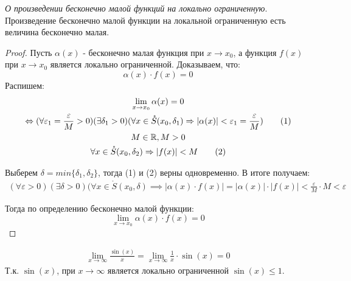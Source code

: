 \begin{theorem}
  \textit{О произведении бесконечно малой функций на локально ограниченную}. \\
  Произведение бесконечно малой функции на локальной ограниченную есть величина бесконечно малая.
\end{theorem}
\begin{proof}
  Пусть $\alpha(x)$ - бесконечно малая функция при $x \to x_0$, а функция $f(x)$ при $x \to  x_0$ является локально ограниченной. Доказываем, что: \[
  \alpha(x) \cdot f(x) = 0
  \] 
  Распишем:
  \begin{gather*}
    \lim_{x \to x_0} \alpha(x) = 0 \\
    \iff (\forall \varepsilon_1 = \frac{\varepsilon}{M} > 0)(\exists \delta_1 > 0)(\forall x \in \mathring{S}(x_0, \delta_1) \implies |\alpha(x)| < \varepsilon_1 = \frac{\varepsilon}{M}) \tag{1}\\
    M \in \R, M > 0 \\
    \forall x \in  \mathring{S}(x_0, \delta_2) \implies |f(x)| < M \tag{2} \\ 
  \end{gather*}

  Выберем $\delta = min \{\delta_1, \delta_2\} $, тогда (1) и (2) верны одновременно. В итоге получаем:
  \begin{gather*}
    (\forall \varepsilon > 0)(\exists \delta > 0)(\forall x \in \mathring{S}(x_0, \delta) \implies |\alpha(x) \cdot f(x)| = |\alpha(x)| \cdot |f(x)| < \frac{\varepsilon}{M} \cdot M < \varepsilon  
  \end{gather*}

  Тогда по определению бесконечно малой функции:
  \[
  \lim_{x \to x_0} \alpha(x) \cdot f(x) = 0
  \] 
\end{proof}
\begin{eg}
  \begin{gather*}
    \lim_{x \to \infty} \frac{\sin(x)}{x} = \lim_{x \to \infty} \frac{1}{x} \cdot \sin(x) = 0
  \end{gather*}
  Т.к. $\sin(x)$, при $x \to \infty$ является локально ограниченной $\sin(x) \le 1$.
\end{eg}

